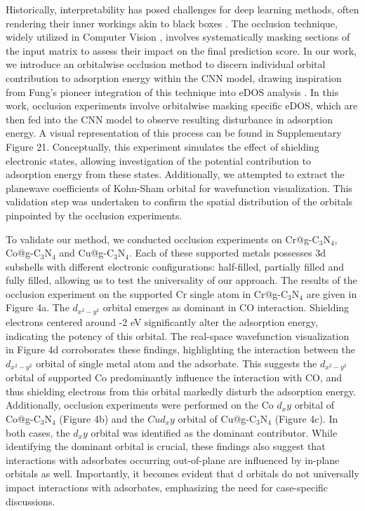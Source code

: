 Historically, interpretability has posed challenges for deep learning methods, often rendering their inner workings akin to black boxes \cite{zhang2018interpretable, zhang2018visual, savage2022breaking}.
The occlusion technique, widely utilized in Computer Vision \cite{zeiler2014visualizing, kortylewski2020combining, wang2020robust}, involves systematically masking sections of the input matrix to assess their impact on the final prediction score.
In our work, we introduce an orbitalwise occlusion method to discern individual orbital contribution to adsorption energy within the CNN model, drawing inspiration from Fung's pioneer integration of this technique into eDOS analysis \cite{fung2021machine}.
In this work, occlusion experiments involve orbitalwise masking specific eDOS, which are then fed into the CNN model to observe resulting disturbance in adsorption energy.
A visual representation of this process can be found in Supplementary Figure 21. Conceptually, this experiment simulates the effect of shielding electronic states, allowing investigation of the potential contribution to adsorption energy from these states.
Additionally, we attempted to extract the planewave coefficients of Kohn-Sham orbital for wavefunction visualization.
This validation step was undertaken to confirm the spatial distribution of the orbitals pinpointed by the occlusion experiments.

To validate our method, we conducted occlusion experiments on Cr@g-C$_3$N$_4$, Co@g-C$_3$N$_4$ and Cu@g-C$_3$N$_4$.
Each of these supported metals possesses 3d subshells with different electronic configurations: half-filled, partially filled and fully filled, allowing us to test the universality of our approach.
The results of the occlusion experiment on the supported Cr single atom in Cr@g-C$_3$N$_4$ are given in Figure 4a.
The $d_{x^2-y^2}$ orbital emerges as dominant in CO interaction.
Shielding electrons centered around -2 eV significantly alter the adsorption energy, indicating the potency of this orbital.
The real-space wavefunction visualization in Figure 4d corroborates these findings, highlighting the interaction between the $d_{x^2-y^2}$ orbital of single metal atom and the adsorbate.
This suggests the $d_{x^2-y^2}$ orbital of supported Co predominantly influence the interaction with CO, and thus shielding electrons from this orbital markedly disturb the adsorption energy.
Additionally, occlusion experiments were performed on the Co $d_xy$ orbital of Co@g-C$_3$N$_4$ (Figure 4b) and the $Cu d_xy$ orbital of Cu@g-C$_3$N$_4$ (Figure 4c).
In both cases, the $d_xy$ orbital was identified as the dominant contributor.
While identifying the dominant orbital is crucial, these findings also suggest that interactions with adsorbates occurring out-of-plane are influenced by in-plane orbitals as well.
Importantly, it becomes evident that d orbitals do not universally impact interactions with adsorbates, emphasizing the need for case-specific discussions.

